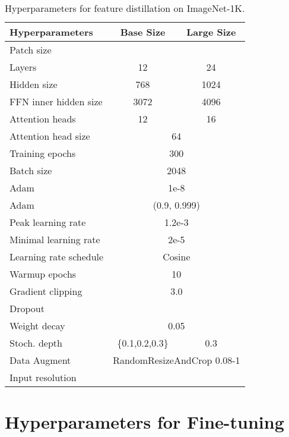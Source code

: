 \documentclass{article}
\newcommand{\xmark}{\ding{55}}
\begin{document}
\begin{table}[H]
    \centering
    \caption{
    Hyperparameters for feature distillation on ImageNet-1K.
    }
    \begin{tabular}{l|cc}
    \toprule
        \bf Hyperparameters & \bf Base Size & \bf Large Size \\
        \midrule
            Patch size &  &  \\
            Layers  & 12 & 24 \\
            Hidden size & 768 & 1024 \\
            FFN inner hidden size & 3072 & 4096 \\
            Attention heads & 12 & 16 \\
            Attention head size & \multicolumn{2}{c}{64} \\
        \midrule
            Training epochs & \multicolumn{2}{c}{300} \\
            Batch size & \multicolumn{2}{c}{2048} \\
            Adam  & \multicolumn{2}{c}{1e-8} \\
            Adam  & \multicolumn{2}{c}{(0.9, 0.999)} \\
            Peak learning rate & \multicolumn{2}{c}{1.2e-3} \\
            Minimal learning rate & \multicolumn{2}{c}{2e-5} \\
            Learning rate schedule & \multicolumn{2}{c}{Cosine} \\
            Warmup epochs & \multicolumn{2}{c}{10} \\
        \midrule
            Gradient clipping & \multicolumn{2}{c}{3.0} \\
            Dropout & \multicolumn{2}{c}{\xmark} \\
            Weight decay & \multicolumn{2}{c}{0.05} \\
            Stoch. depth & \{0.1,0.2,0.3\} & 0.3 \\
        \midrule
            Data Augment & \multicolumn{2}{c}{RandomResizeAndCrop 0.08-1} \\
            Input resolution & \multicolumn{2}{c}{} \\
        \bottomrule
    \end{tabular}
    \label{tab:appd-hyper-pretrain}
\end{table}

\section{Hyperparameters for Fine-tuning}
\end{document}

